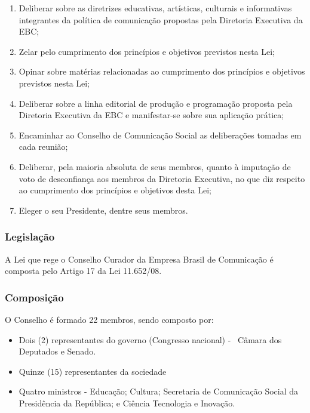\begin{enumerate}
\item 
Deliberar sobre as diretrizes educativas, artísticas, culturais e
informativas integrantes da política de comunicação propostas
pela Diretoria Executiva da EBC;
\item 
Zelar pelo cumprimento dos princípios e objetivos previstos nesta
Lei;
\item 
Opinar sobre matérias relacionadas ao cumprimento dos princípios e
objetivos previstos nesta Lei;
\item 
Deliberar sobre a linha editorial de produção e programação
proposta pela Diretoria Executiva da EBC e manifestar-se sobre sua
aplicação prática;
\item 
Encaminhar ao Conselho de Comunicação Social as deliberações
tomadas em cada reunião;
\item 
Deliberar, pela maioria absoluta de seus membros, quanto à
imputação de voto de desconfiança aos membros da Diretoria
Executiva, no que diz respeito ao cumprimento dos princípios e
objetivos desta Lei;
\item 
Eleger o seu Presidente, dentre seus membros.
\end{enumerate}

\subsubsection*{Legislação}

A Lei que rege o Conselho Curador da Empresa Brasil de Comunicação
é composta pelo Artigo 17 da Lei 11.652/08.

\subsubsection*{Composição}

O Conselho é formado 22 membros, sendo composto por:

\begin{itemize}
\item 
Dois (2) representantes do governo (Congresso nacional) - \ Câmara dos
Deputados e Senado.
\item 
Quinze (15) representantes da sociedade
\item 
Quatro ministros -  Educação; Cultura; Secretaria de
Comunicação Social da Presidência da República; e Ciência
Tecnologia e Inovação.
\end{itemize}

\newpage
